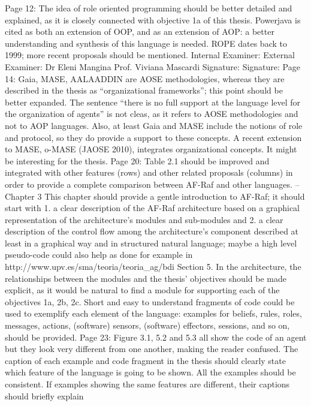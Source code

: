 \documentclass{article}
\newenvironment{them}{\noindent\begingroup\color{blue}}{\endgroup\par}
\begin{document}
\begin{them}
Page 12:
The idea of role oriented programming should be better detailed and explained, as it is closely
connected with objective 1a of this thesis. Powerjava is cited as both an extension of OOP, and as an
extension of AOP: a better understanding and synthesis of this language is needed. ROPE dates back
to 1999; more recent proposals should be mentioned.
Internal Examiner: External Examiner:
Dr Eleni Mangina Prof. Viviana Mascardi
Signature: Signature:
Page 14:
Gaia, MASE, AALAADDIN are AOSE methodologies, whereas they are described in the thesis as
“organizational frameworks”; this point should be better expanded.
The sentence “there is no full support at the language level for the organization of agents” is not
cleas, as it refers to AOSE methodologies and not to AOP languages. Also, at least Gaia and MASE
include the notions of role and protocol, so they do provide a support to these concepts. A recent
extension to MASE, o-MASE (JAOSE 2010), integrates organizational concepts. It might be interesting
for the thesis.
Page 20:
Table 2.1 should be improved and integrated with other features (rows) and other related proposals
(columns) in order to provide a complete comparison between AF-Raf and other languages.
-- Chapter 3
This chapter should provide a gentle introduction to AF-Raf; it should start with
1. a clear description of the AF-Raf architecture based on a graphical representation of the
architecture's modules and sub-modules and
2. a clear description of the control flow among the architecture's component described at least in a
graphical way and in structured natural language; maybe a high level pseudo-code could also help as
done for example in http://www.upv.es/sma/teoria/teoria_ag/bdi%
Section 5.
In the architecture, the relationships between the modules and the thesis' objectives should be
made explicit, as it would be natural to find a module for supporting each of the objectives 1a, 2b,
2c.
Short and easy to understand fragments of code could be used to exemplify each element of the
language: examples for beliefs, rules, roles, messages, actions, (software) sensors, (software)
effectors, sessions, and so on, should be provided.
Page 23:
Figure 3.1, 5.2 and 5.3 all show the code of an agent but they look very different from one another,
making the reader confused. The caption of each example and code fragment in the thesis should
clearly state which feature of the language is going to be shown. All the examples should be
consistent. If examples showing the same features are different, their captions should briefly explain

\end{them}
\end{document}
